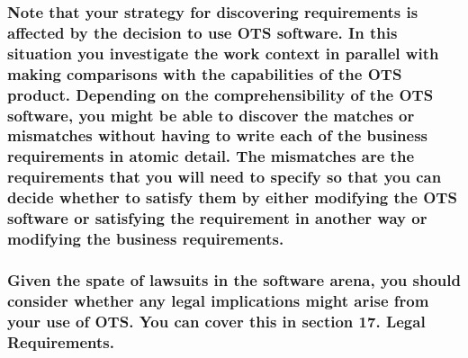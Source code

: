\documentclass[
]{article}
\begin{document}
\hypertarget{note-that-your-strategy-for-discovering-requirements-is-affected-by-the-decision-to-use-ots-software.-in-this-situation-you-investigate-the-work-context-in-parallel-with-making-comparisons-with-the-capabilities-of-the-ots-product.-depending-on-the-comprehensibility-of-the-ots-software-you-might-be-able-to-discover-the-matches-or-mismatches-without-having-to-write-each-of-the-business-requirements-in-atomic-detail.-the-mismatches-are-the-requirements-that-you-will-need-to-specify-so-that-you-can-decide-whether-to-satisfy-them-by-either-modifying-the-ots-software-or-satisfying-the-requirement-in-another-way-or-modifying-the-business-requirements.}{%
\subsubsection{Note that your strategy for discovering requirements is
affected by the decision to use OTS software. In this situation you
investigate the work context in parallel with making comparisons with
the capabilities of the OTS product. Depending on the comprehensibility
of the OTS software, you might be able to discover the matches or
mismatches without having to write each of the business requirements in
atomic detail. The mismatches are the requirements that you will need to
specify so that you can decide whether to satisfy them by either
modifying the OTS software or satisfying the requirement in another way
or modifying the business
requirements.}\label{note-that-your-strategy-for-discovering-requirements-is-affected-by-the-decision-to-use-ots-software.-in-this-situation-you-investigate-the-work-context-in-parallel-with-making-comparisons-with-the-capabilities-of-the-ots-product.-depending-on-the-comprehensibility-of-the-ots-software-you-might-be-able-to-discover-the-matches-or-mismatches-without-having-to-write-each-of-the-business-requirements-in-atomic-detail.-the-mismatches-are-the-requirements-that-you-will-need-to-specify-so-that-you-can-decide-whether-to-satisfy-them-by-either-modifying-the-ots-software-or-satisfying-the-requirement-in-another-way-or-modifying-the-business-requirements.}}

\hypertarget{given-the-spate-of-lawsuits-in-the-software-arena-you-should-consider-whether-any-legal-implications-might-arise-from-your-use-of-ots.-you-can-cover-this-in-section-17.-legal-requirements.}{%
\subsubsection{Given the spate of lawsuits in the software arena, you
should consider whether any legal implications might arise from your use
of OTS. You can cover this in section 17. Legal
Requirements.}\label{given-the-spate-of-lawsuits-in-the-software-arena-you-should-consider-whether-any-legal-implications-might-arise-from-your-use-of-ots.-you-can-cover-this-in-section-17.-legal-requirements.}}
\end{document}
